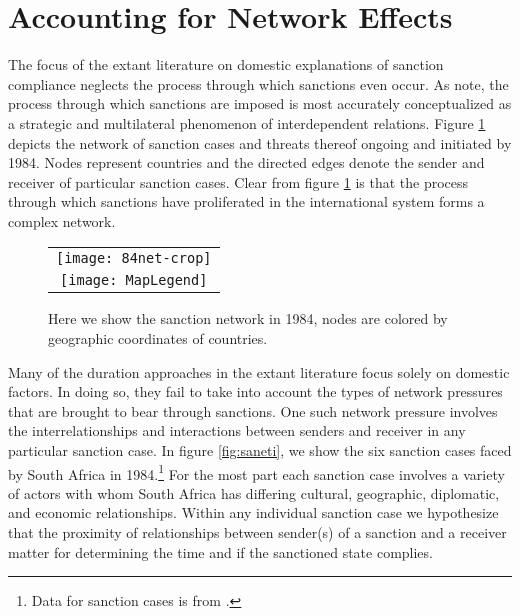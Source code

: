 
\section*{Accounting for Network Effects}
\label{neteffects}

The focus of the extant literature on domestic explanations of sanction compliance neglects the process through which sanctions even occur. As \citet{cranmer2014reciprocity} note, the process through which sanctions are imposed is most accurately conceptualized as a strategic and multilateral phenomenon of interdependent relations. Figure \ref{fig:spaghetti} depicts the network of sanction cases and threats thereof ongoing and initiated by 1984. Nodes represent countries and the directed edges denote the sender and receiver of particular sanction cases. Clear from figure \ref{fig:spaghetti} is that the process through which sanctions have proliferated in the international system forms a complex network. 

\begin{figure}[ht]
  \centering
  \begin{tabular}{c}
	  \texttt{[image: 84net-crop]} \\
	  \texttt{[image: MapLegend]}
  \end{tabular}
  \caption{Here we show the sanction network in 1984, nodes are colored by geographic coordinates of countries.}
  \label{fig:spaghetti}
\end{figure}
\FloatBarrier

Many of the duration approaches in the extant literature focus solely on domestic factors. In doing so, they fail to take into account the types of network pressures that are brought to bear through sanctions. One such network pressure involves the interrelationships and interactions between senders and receiver in any particular sanction case. In figure \ref{fig:saneti}, we show the six sanction cases faced by South Africa in 1984.\footnote{Data for sanction cases is from \citet{morgan2009threat}.} For the most part each sanction case involves a variety of actors with whom South Africa has differing cultural, geographic, diplomatic, and economic relationships. Within any individual sanction case we hypothesize that the proximity of relationships between sender(s) of a sanction and a receiver matter for determining the time and if the sanctioned state complies. 

